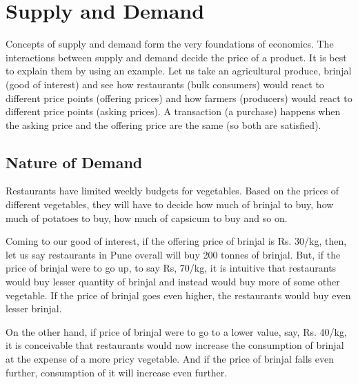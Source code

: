 \chapter{Supply and Demand}
Concepts of supply and demand form the very foundations of economics. The interactions between supply and demand decide the price of a product. It is best to explain them by using an example. Let us take an agricultural produce, brinjal (good of interest) and see how restaurants (bulk consumers) would react to different price points (offering prices) and how farmers (producers) would react to different price points (asking prices).  A transaction (a purchase) happens when the asking price and the offering price are the same (so both are satisfied).

\section{Nature of Demand}
Restaurants have limited weekly budgets for vegetables. Based on the prices of different vegetables, they will have to decide how much of brinjal to buy, how much of potatoes to buy, how much of capsicum to buy and so on. 

Coming to our good of interest, if the offering price of brinjal is Rs. 30/kg, then, let us say restaurants in Pune overall will buy 200 tonnes of brinjal. But, if the price of brinjal were to go up, to say Rs, 70/kg, it is intuitive that restaurants would buy lesser quantity of brinjal and instead would buy more of some other vegetable. If the price of brinjal goes even higher, the restaurants would buy even lesser brinjal. 

On the other hand, if price of brinjal were to go to a lower value, say, Rs. 40/kg, it is conceivable that restaurants would now increase the consumption of brinjal at the expense of a more pricy vegetable. And if the price of brinjal falls even further, consumption of it will increase even further.

